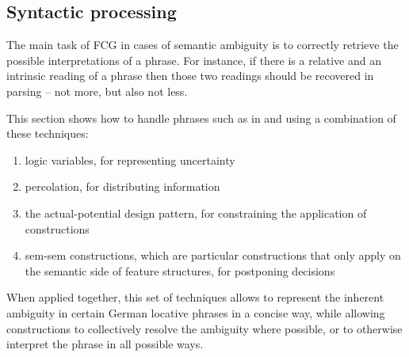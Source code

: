 \subsection{Syntactic processing}
\label{s:semantic-ambiguity-syntactic}
The main task of FCG in cases of semantic ambiguity is to correctly 
retrieve the possible interpretations of a phrase. For instance, if there
is a relative and an intrinsic reading of a phrase then those two 
readings should be recovered in parsing -- not more, but also not less.

This section shows how to handle phrases such as in  
 and 
using a combination of these techniques:
\begin{enumerate}
\item {logic variables}, for representing uncertainty
\item {percolation}, for distributing information
\item {the actual-potential design pattern}, for constraining the 
application of constructions
\item {sem-sem constructions}, which are particular constructions 
that only apply on the semantic side of 
feature structures, for postponing decisions
\end{enumerate}
When applied together, this set of techniques allows to represent 
the inherent ambiguity in certain German locative phrases in a 
concise way, while allowing constructions to collectively resolve the ambiguity 
where possible, or to otherwise interpret the phrase in all possible ways.

